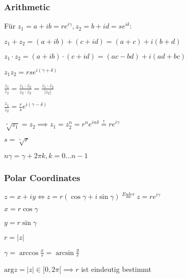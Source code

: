 \subsubsection{Arithmetic}
Für $z_1 = a + ib = re^{i \gamma}, z_2 = b + id = se^{i \delta}$:
\begin{compactitem}
    \item $z_1 + z_2 = (a + ib) + (c + id) = (a + c) + i(b + d)$
    \item $z_1 \cdot z_2 = (a + ib) \cdot (c + id) = (ac - bd) + i(ad + bc)$
        \begin{compactitem}
            \item $z_1 z_2 = rse^{i(\gamma + \delta)}$
        \end{compactitem}
    \item $\frac{z_1}{z_2} = \frac{z_1 \cdot \overline{z_2}}{z_2 \cdot \overline{z_2}}= \frac{z_1 \cdot \overline{z_2}}{|z_2|}$
        \begin{compactitem}
            \item $\frac{z_1}{z_2} = \frac{r}{s}e^{i(\gamma - \delta)}$
        \end{compactitem}
        \item $\sqrt[^n]{z_1} = z_2 \implies z_1 = z_2^n = r^ne^{i n \delta} \overset{!}{=} re^{i\gamma}$
            \begin{compactitem}
                \item $s = \sqrt[^n]{r}$
                \item $n \gamma = \gamma + 2 \pi k, k = 0\dots n - 1$
            \end{compactitem}
\end{compactitem}

\subsubsection{Polar Coordinates}
$z = x + iy \iff z = r(\cos \gamma + i \sin \gamma) \overset{Euler}{=} z = r e^{i \gamma}$
\begin{compactitem}
    \item 
        \begin{inparaitem}
            \item $x = r \cos \gamma$ 
            \item $y = r \sin \gamma$
        \end{inparaitem}
    \item $r = |z|$
    \item $\gamma = \arccos \frac{x}{r} = \arcsin \frac{y}{r}$
    \item $\text{arg}z = |z| \in [0, 2\pi[ \implies r$ ist eindeutig bestimmt
\end{compactitem}

